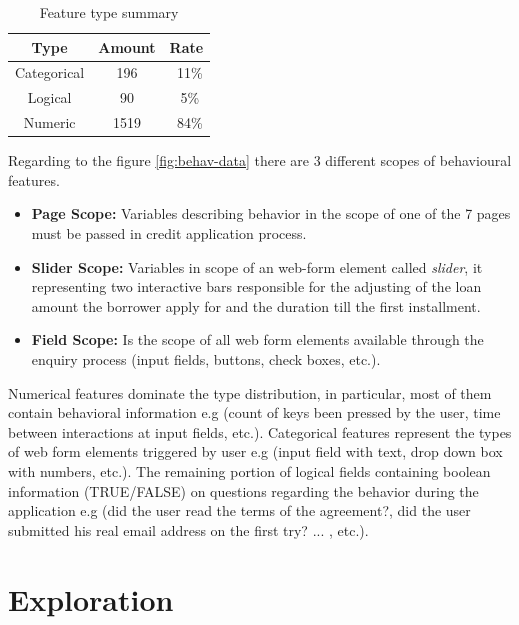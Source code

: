 \begin{table}[h!]
  \begin{center}
    \caption{Feature type summary}
    \label{tab:feature-summary}
    \begin{tabular}{c|c|c}
    Type & Amount & Rate \\
      \hline
     Categorical & 196 & ~11\% \\ 
     \hline
     Logical & 90 &  ~5\% \\
     \hline
     Numeric & 1519 &  ~84\% \\
     \hline
    \end{tabular}
  \end{center}
\end{table}

Regarding to the figure \ref{fig:behav-data} there are 3 different scopes of behavioural features.

\begin{itemize}
    \item \textbf{Page Scope:} Variables describing behavior in the scope of one of the 7 pages must be passed in credit application process. 
    \item \textbf{Slider Scope: } Variables in scope of an web-form element called \textit{slider}, it representing two interactive bars responsible for the adjusting of the loan amount the borrower apply for and the duration till the first installment.
    \item \textbf{Field Scope:} Is the scope of all web form elements available through the enquiry process (input fields, buttons, check boxes, etc.).
\end{itemize}

Numerical features dominate the type distribution, in particular, most of them contain behavioral information e.g (count of keys been pressed by the user, time between interactions at input fields, etc.). Categorical features represent the types of web form elements triggered by user e.g (input field with text, drop down box with numbers, etc.). The remaining portion of logical fields containing boolean information (TRUE/FALSE) on questions regarding the behavior during the application e.g (did the user read the terms of the agreement?, did the user submitted his real email address on the first try? ... , etc.).

\section{Exploration}\label{Ch:2:Exploration}

